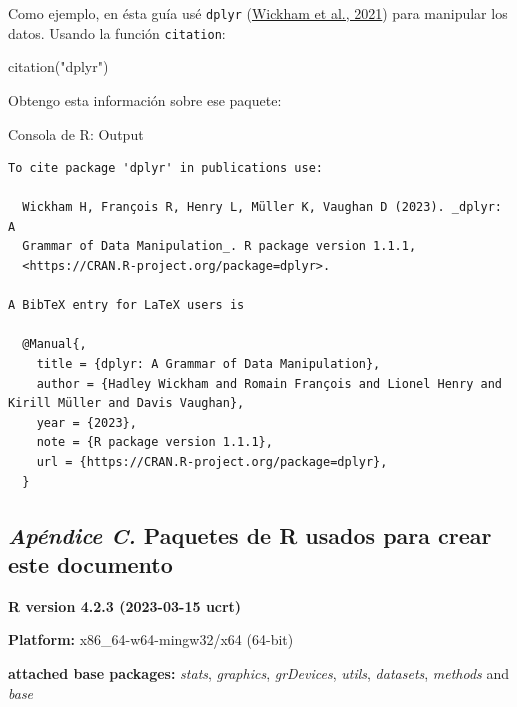 \documentclass[
  bookmarksnumbered]{article}
\newenvironment{Shaded}{\begin{snugshade}}{\end{snugshade}}
\newcommand{\FunctionTok}[1]{\textcolor[rgb]{0.39,0.29,0.61}{#1}}
\newcommand{\NormalTok}[1]{\textcolor[rgb]{0.12,0.11,0.11}{#1}}
\newcommand{\StringTok}[1]{\textcolor[rgb]{0.75,0.01,0.01}{#1}}
\begin{document}
Como ejemplo, en ésta guía usé \texttt{dplyr} (\protect\hyperlink{ref-WickhamDplyr2021}{Wickham et al., 2021}) para manipular los datos. Usando la función \texttt{citation}:

\begin{Shaded}
\begin{Highlighting}[]
\FunctionTok{citation}\NormalTok{(}\StringTok{"dplyr"}\NormalTok{)}
\end{Highlighting}
\end{Shaded}

Obtengo esta información sobre ese paquete:

\begin{ROut}{Consola de R: Output~\thetcbcounter}
                \begin{footnotesize}
                \begin{verbatim} 
To cite package 'dplyr' in publications use:

  Wickham H, François R, Henry L, Müller K, Vaughan D (2023). _dplyr: A
  Grammar of Data Manipulation_. R package version 1.1.1,
  <https://CRAN.R-project.org/package=dplyr>.

A BibTeX entry for LaTeX users is

  @Manual{,
    title = {dplyr: A Grammar of Data Manipulation},
    author = {Hadley Wickham and Romain François and Lionel Henry and Kirill Müller and Davis Vaughan},
    year = {2023},
    note = {R package version 1.1.1},
    url = {https://CRAN.R-project.org/package=dplyr},
  }
 \end{verbatim}
                \end{footnotesize}
                \end{ROut}

\hypertarget{paquetes-list}{%
\subsection*{\texorpdfstring{\emph{Apéndice C.} Paquetes de R usados para crear este documento}{Apéndice C. Paquetes de R usados para crear este documento}}\label{paquetes-list}}

\textbf{R version 4.2.3 (2023-03-15 ucrt)}

\textbf{Platform:} x86\_64-w64-mingw32/x64 (64-bit)

\textbf{attached base packages:}
\emph{stats}, \emph{graphics}, \emph{grDevices}, \emph{utils}, \emph{datasets}, \emph{methods} and \emph{base}
\end{document}
